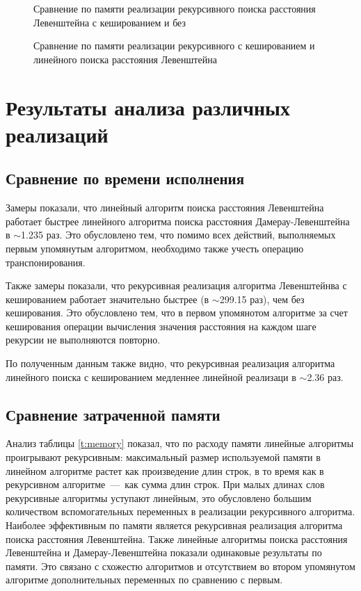 \begin{figure}[H]
	\centering
	
	\caption{Сравнение по памяти реализации рекурсивного поиска расстояния Левенштейна с кешированием и без}
	\label{plt:memory_mat_rec}
\end{figure}

\begin{figure}[H]
	\centering
	
	\caption{Сравнение по памяти реализации рекурсивного с кешированием и линейного поиска расстояния Левенштейна}
	\label{plt:memory_rec}
\end{figure}

\clearpage

\section{Результаты анализа различных реализаций}

\subsection{Сравнение по времени исполнения}
Замеры показали, что линейный алгоритм поиска расстояния Левенштейна работает быстрее линейного алгоритма поиска расстояния Дамерау-Левенштейна в $\sim$1.235 раз. Это обусловлено тем, что помимо всех действий, выполняемых первым упомянутым алгоритмом, необходимо также учесть операцию транспонирования.

Также замеры показали, что рекурсивная реализация алгоритма Левенштейнва с кешированием работает значительно быстрее (в $\sim$299.15 раз), чем без кеширования. Это обусловлено тем, что в первом упомянотом алгоритме за счет кеширования операции вычисления значения расстояния на каждом шаге рекурсии не выполняются повторно.

По полученным данным также видно, что рекурсивная реализация алгоритма линейного поиска с кешированием медленнее линейной реализаци в $\sim$2.36 раз.

\subsection{Сравнение затраченной памяти}

Анализ таблицы \ref{t:memory} показал, что по расходу памяти линейные алгоритмы проигрывают рекурсивным: максимальный размер используемой памяти в линейном алгоритме растет как произведение длин строк, в то время как в рекурсивном алгоритме~---~как сумма длин строк.
При малых длинах слов рекурсивные алгоритмы уступают линейным, это обусловлено большим количеством вспомогательных переменных в реализации рекурсивного алгоритма. Наиболее эффективным по памяти является рекурсивная реализация алгоритма поиска расстояния Левенштейна.
Также линейные алгоритмы поиска расстояния Левенштейна и Дамерау-Левенштейна показали одинаковые результаты по памяти. Это связано с схожестю алгоритмов и отсутствием во втором упомянутом алгоритме дополнительных переменных по сравнению с первым.